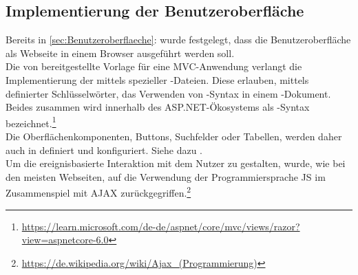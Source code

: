 \subsection{Implementierung der Benutzeroberfläche}
\label{sec:ImplementierungBenutzeroberflaeche}
Bereits in \ref{sec:Benutzeroberflaeche}:  wurde festgelegt, dass die Benutzeroberfläche
als Webseite in einem Browser ausgeführt werden soll.\\
Die von  bereitgestellte Vorlage für eine \ac{MVC}-Anwendung verlangt
die Implementierung der  mittels spezieller -Dateien.
Diese erlauben, mittels definierter Schlüsselwörter, das Verwenden von -Syntax in einem
-Dokument. Beides zusammen wird innerhalb des ASP.NET-Ökosystems als -Syntax
bezeichnet.\footnote{\url{https://learn.microsoft.com/de-de/aspnet/core/mvc/views/razor?view=aspnetcore-6.0}}\\ 
Die Oberflächenkomponenten, \zB Buttons, Suchfelder oder Tabellen, werden daher auch in  
definiert und konfiguriert. Siehe dazu .\\
Um die ereignisbasierte Interaktion mit dem Nutzer zu gestalten, wurde, wie bei den meisten Webseiten,
auf die Verwendung der Programmiersprache \acs{JS} im Zusammenspiel mit \acs{AJAX} zurückgegriffen.\footnote{\url{https://de.wikipedia.org/wiki/Ajax_(Programmierung)}}

